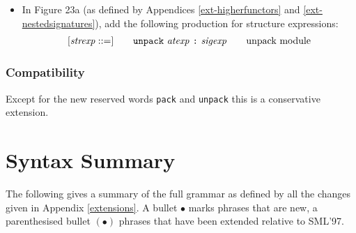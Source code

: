 \documentclass[twoside,titlepage]{article}
\newcommand{\void}[1]{}
\begin{document}
\begin{appendix}
\begin{itemize}
\item In Figure 23a (as defined by Appendices \ref{ext-higherfunctors} and \ref{ext-nestedsignatures}), add the following production for structure expressions:
  $$
  \begin{array}{l@{\qquad}l@{\qquad}l}
  [\mathit{strexp} ::=] & {\tt{unpack}}~\mathit{atexp}~\mbox{\tt:}~\mathit{sigexp} & \textrm{unpack module} \\
  \end{array}
  $$
\end{itemize}

\subsubsection*{Compatibility}

Except for the new reserved words {\tt pack} and {\tt unpack} this is a conservative extension.


\void{ Template!
\subsection{}
\label{ext-}

\subsubsection*{Changes to the Definition}

Section ():
\begin{itemize}
\item
\end{itemize}

\subsubsection*{Compatibility}

This is a conservative extension.
}


\section{Syntax Summary}
\label{grammar}

The following gives a summary of the full grammar as defined by all the changes given in Appendix \ref{extensions}. A bullet $\bullet$ marks phrases that are new, a parenthesised bullet $(\bullet)$ phrases that have been extended relative to SML'97.


\end{appendix}
\end{document}
